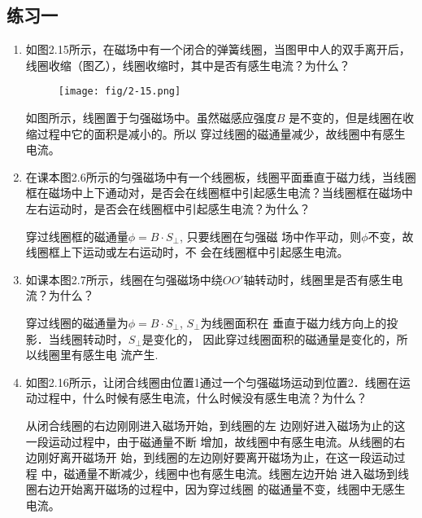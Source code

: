 \subsection{练习一}
\begin{enumerate}
    \item 如图2.15所示，在磁场中有一个闭合的弹簧线圈，当图甲中人的双手离开后，线圈收缩（图乙），线圈收缩时，其中是否有感生电流？为什么？
\begin{figure}[htp]\centering
\texttt{[image: fig/2-15.png]}
\caption{}
\end{figure}


\begin{solution}
    如图所示，线圈置于匀强磁场中。虽然磁感应强度$B$
    是不变的，但是线圈在收缩过程中它的面积是减小的。所以
    穿过线圈的磁通量减少，故线圈中有感生电流。
\end{solution}

    \item 在课本图2.6所示的匀强磁场中有一个线圈板，线圈平面垂直于磁力线，当线圈框在磁场中上下通动对，是否会在线圈框中引起感生电流？当线圈框在磁场中左右运动时，是否会在线圈框中引起感生电流？为什么？


\begin{solution}
    穿过线圈框的磁通量$\phi=B\cdot S_{\bot}$, 只要线圈在匀强磁
    场中作平动，则$\phi$不变，故线圈框上下运动或左右运动时，不
    会在线圈框中引起感生电流。
\end{solution}

    \item 如课本图2.7所示，线圈在匀强磁场中绕$OO'$轴转动时，线圈里是否有感生电流？为什么？

    \begin{solution}
        穿过线圈的磁通量为$\phi=B\cdot S_{\bot}$, $S_{\bot}$为线圈面积在
        垂直于磁力线方向上的投影．当线圈转动时，$S_{\bot}$是变化的，
        因此穿过线圈面积的磁通量是变化的，所以线圈里有感生电
        流产生.
    \end{solution}
    
    \item 如图2.16所示，让闭合线圈由位置1通过一个匀强磁场运动到位置2．线圈在运动过程中，什么时候有感生电流，什么时候没有感生电流？为什么？

    \begin{solution}
        从闭合线圈的右边刚刚进入磁场开始，到线圈的左
        边刚好进入磁场为止的这一段运动过程中，由于磁通量不断
        增加，故线圈中有感生电流。从线圈的右边刚好离开磁场开
        始，到线圈的左边刚好要离开磁场为止，在这一段运动过程
        中，磁通量不断减少，线圈中也有感生电流。线圈左边开始
        进入磁场到线圈右边开始离开磁场的过程中，因为穿过线圈
        的磁通量不变，线圈中无感生电流。
    \end{solution}
    

\end{enumerate}
